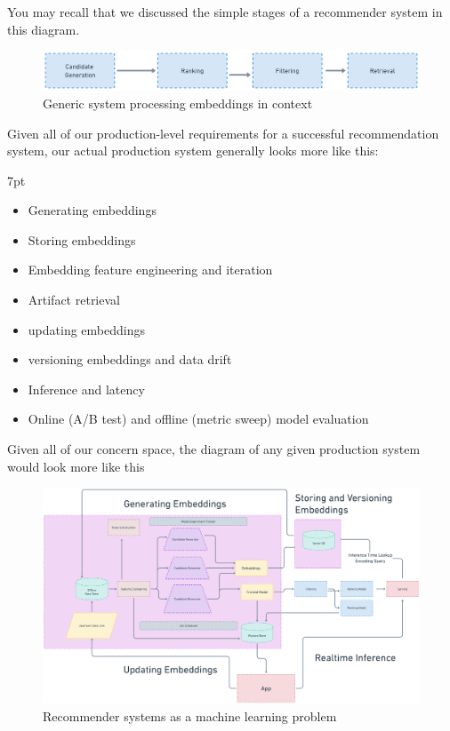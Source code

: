 \documentclass[11pt, table]{diazessay} %
\newenvironment{formal}{%
  \def\FrameCommand{%
	\hspace{1pt}%
	{\color{w_lightblue}\vrule width 2pt}%
	{\color{formalshade}\vrule width 4pt}%
	\colorbox{formalshade}%
  }%
  \MakeFramed{\advance\hsize-\width\FrameRestore}%
  \noindent\hspace{-4.55pt}%
  \begin{adjustwidth}{}{7pt}%
  \vspace{2pt}\vspace{2pt}%
}
{%
  \vspace{2pt}\end{adjustwidth}\endMakeFramed%
}
\begin{document}
\begin{sloppypar}
You may recall that we discussed the simple stages of a recommender system in this diagram.

\begin{figure}[H]
\centering
\includegraphics[width=\textwidth]{figures/recsys.png}
\caption{Generic system processing embeddings in context}
\end{figure}

Given all of our production-level requirements for a successful recommendation system, our actual production system generally looks more like this:

\begin{formal}
\begin{itemize}
  \item Generating embeddings
  \item Storing embeddings
  \item Embedding feature engineering and iteration
  \item Artifact retrieval
  \item updating embeddings
  \item versioning embeddings and data drift
  \item Inference and latency
  \item Online (A/B test) and offline (metric sweep) model evaluation
\end{itemize}
\end{formal}

Given all of our concern space, the diagram of any given production system would look more like this

\begin{figure}[H]
\centering
\includegraphics[width=\textwidth]{figures/embeddings_arch.png}
\caption{Recommender systems as a machine learning problem}
\end{figure}



\end{sloppypar}
\end{document}
